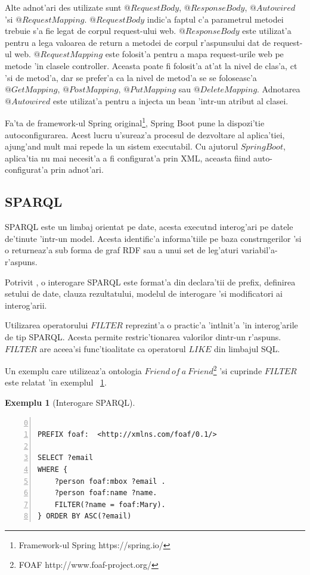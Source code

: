 \documentclass[12pt,a4paper,twoside]{report}
\newtheorem{example}{Exemplu}
\begin{document}
Alte adnot'ari des utilizate sunt $@RequestBody$, $@ResponseBody$, $@Autowired$ 'si $@RequestMapping$. $@RequestBody$ indic'a faptul c'a parametrul metodei trebuie s'a fie legat de corpul request-ului web. $@ResponseBody$ este utilizat'a pentru a lega valoarea de return a metodei de corpul r'aspunsului dat de request-ul web. $@RequestMapping$ este folosit'a pentru a mapa request-urile web pe metode 'in clasele controller. Aceasta poate fi folosit'a at'at la nivel de clas'a, c\ia t 'si de metod'a, dar se prefer'a ca la nivel de metod'a se se foloseasc'a $@GetMapping$, $@PostMapping$, $@PutMapping$ sau $@DeleteMapping$. Adnotarea $@Autowired$ este utilizat'a pentru a injecta un bean 'intr-un atribut al clasei.

Fa'ta de framework-ul Spring original\footnote{Framework-ul Spring https://spring.io/}, Spring Boot pune la dispozi'tie autoconfigurarea. Acest lucru u'sureaz'a procesul de dezvoltare al aplica'tiei, ajung'and mult mai repede la un sistem executabil. Cu ajutorul $SpringBoot$, aplica'tia nu mai necesit'a a fi configurat'a prin XML, aceasta fiind auto-configurat'a prin adnot'ari.

\subsection{SPARQL}

SPARQL este un limbaj orientat pe date, acesta execut\ia nd interog'ari pe datele de'tinute 'intr-un model. Acesta identific'a informa'tiile pe baza constr\ia ngerilor 'si o returneaz'a sub forma de graf RDF sau a unui set de leg'aturi variabil'a-r'aspuns.

Potrivit \cite{sparql_tutorial}, o interogare SPARQL este format'a din declara'tii de prefix, definirea setului de date, clauza rezultatului, modelul de interogare 'si modificatori ai interog'arii.

Utilizarea operatorului $FILTER$ reprezint'a o practic'a 'int\ia lnit'a 'in interog'arile de tip SPARQL. Acesta permite restric'tionarea valorilor dintr-un r'aspuns. $FILTER$ are aceea'si func'tioalitate ca operatorul $LIKE$ din limbajul SQL. 

Un exemplu care utilizeaz'a ontologia $Friend\ of\ a\ Friend$\footnote{FOAF http://www.foaf-project.org/} 'si cuprinde $FILTER$ este relatat 'in exemplul ~\ref{ex:sparql_ex}.



\begin{example}[Interogare SPARQL]
\begin{lstlisting}[basicstyle=\footnotesize, numbers=left, firstnumber = 0]

PREFIX foaf:  <http://xmlns.com/foaf/0.1/>

SELECT ?email
WHERE {
    ?person foaf:mbox ?email .
    ?person foaf:name ?name.
    FILTER(?name = foaf:Mary).
} ORDER BY ASC(?email)
\end{lstlisting}
\label{ex:sparql_ex}
\end{example}
\end{document}
